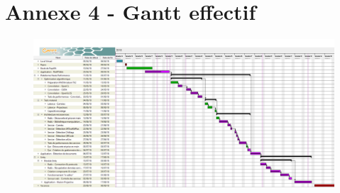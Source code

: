 \chapter*{Annexe 4 - Gantt effectif}
\label{annexe:gantt}

\begin{figure}[H]
\centering
\includegraphics[scale=0.35, angle=90]{images/GanttMemoireLong}
\end{figure}